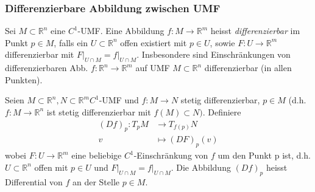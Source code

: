 \documentclass[../main.tex]{subfiles}
\begin{document}
\subsubsection*{Differenzierbare Abbildung zwischen UMF}
Sei $M \subset \mathbb{R}^n$ eine $C^1$-UMF. Eine Abbildung $f : M \to \mathbb{R}^m$ heisst \emph{differenzierbar} im Punkt $p \in M$, falls ein $U \subset \mathbb{R}^n$ offen existiert mit
$p\in U$, sowie $F: U \to \mathbb{R}^m$ differenzierbar mit $F\vert_{U \cap M} = f \vert_{U \cap M}$.
Insbesondere sind Einschränkungen von differenzierbaren Abb. $f:\mathbb{R}^n \to \mathbb{R}^m$ auf UMF $M \subset \mathbb{R}^n$ differenzierbar (in allen Punkten).

\begin{definition}
Seien $M \subset \mathbb{R}^n, N \subset \mathbb{R}^m C^1$-UMF und $f: M \to N$ stetig differenzierbar,
$p \in M$ (d.h. $f : M \to \mathbb{R}^n$ ist stetig differenzierbar mit $f(M) \subset N)$. Definiere
\begin{align*}
    (Df)_p : T_pM & \to T_{f(p)}N \\
    v & \mapsto (DF)_p(v)
\end{align*}
wobei $F : U \to \mathbb{R}^m$ eine beliebige $C^1$-Einschränkung von $f$ um den Punkt p ist, d.h.
$U \subset \mathbb{R}^n$ offen mit $p \in U$ und $F \vert_{U \cap M} = f \vert_{U \cap M}$. Die Abbildung $(Df)_p$ heisst Differential von $f$ an der Stelle $p \in M$.
\end{definition}
\end{document}
